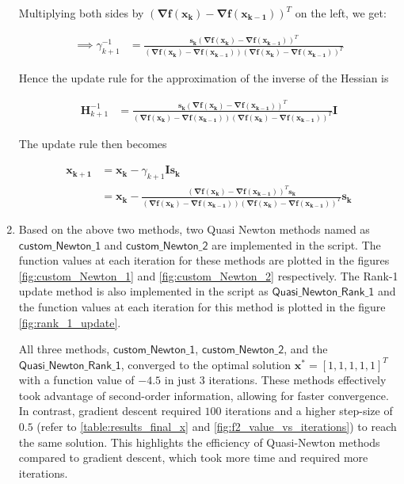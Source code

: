 \documentclass[12pt,a4paper]{article}
\theoremstyle{remark}
\begin{document}
\begin{enumerate}
    Multiplying both sides by $(\mathbf{\nabla f(\mathbf{x}_k) - \nabla f(\mathbf{x}_{k - 1})})^T$ on the left, we get:

    \begin{align*}
        \implies \gamma_{k + 1}^{-1} &= \frac{\mathbf{s_k}(\mathbf{\nabla f(\mathbf{x}_k) - \nabla f(\mathbf{x}_{k - 1})})^T}{(\mathbf{\nabla f(\mathbf{x}_k) - \nabla f(\mathbf{x}_{k - 1})})(\mathbf{\nabla f(\mathbf{x}_k) - \nabla f(\mathbf{x}_{k - 1})})^T}
    \end{align*}

    Hence the update rule for the approximation of the inverse of the Hessian is

    \begin{align*}
        \mathbf{H}_{k + 1}^{-1} &= \frac{\mathbf{s_k}(\mathbf{\nabla f(\mathbf{x}_k) - \nabla f(\mathbf{x}_{k - 1})})^T}{(\mathbf{\nabla f(\mathbf{x}_k) - \nabla f(\mathbf{x}_{k - 1})})(\mathbf{\nabla f(\mathbf{x}_k) - \nabla f(\mathbf{x}_{k - 1})})^T} \mathbf{I}
    \end{align*}

    The update rule then becomes

    \begin{align*}
        \mathbf{x_{k + 1}} &= \mathbf{x_k} - \gamma_{k + 1} \mathbf{I} \mathbf{s_k} \\
        &= \mathbf{x_k} - \frac{(\mathbf{\nabla f(\mathbf{x}_k) - \nabla f(\mathbf{x}_{k - 1})})^T \mathbf{s_k}}{(\mathbf{\nabla f(\mathbf{x}_k) - \nabla f(\mathbf{x}_{k - 1})})(\mathbf{\nabla f(\mathbf{x}_k) - \nabla f(\mathbf{x}_{k - 1})})^T} \mathbf{s_k}
    \end{align*}

    \item Based on the above two methods, two Quasi Newton methods named as $\mathsf{custom\_Newton\_1}$ and $\mathsf{custom\_Newton\_2}$ are implemented in the script. The function values at each iteration for these methods are plotted in the figures \ref{fig:custom_Newton_1} and \ref{fig:custom_Newton_2} respectively. The Rank-1 update method is also implemented in the script as $\mathsf{Quasi\_Newton\_Rank\_1}$ and the function values at each iteration for this method is plotted in the figure \ref{fig:rank_1_update}.
    
    All three methods, $\mathsf{custom\_Newton\_1}$, $\mathsf{custom\_Newton\_2}$, and the $\mathsf{Quasi\_Newton\_Rank\_1}$, converged to the optimal solution $\mathbf{x}^* = [1, 1, 1, 1, 1]^T$ with a function value of $-4.5$ in just $3$ iterations. These methods effectively took advantage of second-order information, allowing for faster convergence. In contrast, gradient descent required $100$ iterations and a higher step-size of $0.5$ (refer to \ref{table:results_final_x} and \ref{fig:f2_value_vs_iterations}) to reach the same solution. This highlights the efficiency of Quasi-Newton methods compared to gradient descent, which took more time and required more iterations.
    

\end{enumerate}
\end{document}
